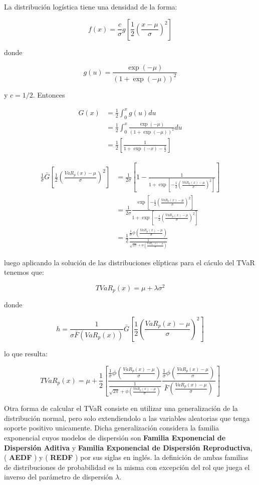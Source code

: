 \documentclass[]{article}
\begin{document}
La distribución logística tiene una densidad de la forma:

\[f(x)=\frac{c}{\sigma}g\left[\frac{1}{2}\left(\frac{x-\mu}{\sigma}\right)^2\right]\]

donde

\[g(u)= \frac{\exp(-\mu)}{(1+ \exp(-\mu))^2}\]

y \(c=1/2\). Entonces

\[\begin{array}{rl}
G(x) &\displaystyle=\frac{1}{2}\int_{0}^{x}g(u)du\\
&\displaystyle=\frac{1}{2}\int_{0}^{x}\frac{\exp(-\mu)}{(1+ \exp(-\mu))^2}du\\
&\displaystyle=\frac{1}{2}\left[\frac{1}{1+\exp(-x)-\frac{1}{2}}\right]
\end{array}\]

\[\begin{array}{rl}
\frac{1}{\sigma} \bar{G}\left[\frac{1}{2}\left(\frac{VaR_p(x)-\mu}{\sigma}\right)^2\right] &\displaystyle= \frac{1}{2 \sigma} \left[1-\frac{1}{1+ \exp\left[-\frac{1}{2}\left(\frac{VaR_p(x)-\mu}{\sigma}\right)^2\right]}\right]\\
&\displaystyle
= \frac{1}{2 \sigma}\frac{\exp\left[-\frac{1}{2} \left(\frac{VaR_p(x)-\mu}{\sigma}\right)^2\right]}{1+ \exp \left[-\frac{1}{2} \left(\frac{VaR_p(x)-\mu}{\sigma}\right)^2\right]}\\
&\displaystyle= \frac{1}{2} \frac{ \frac{1}{\sigma}\phi\left(\frac{VaR_p(x)-\mu}{\sigma}\right)}{\frac{1}{\sqrt{2\pi}+\phi\left(\frac{VaR_p(x)-\mu}{\sigma}\right)}}
\end{array}\]

luego aplicando la solución de las distribuciones elípticas para el
cáculo del TVaR tenemos que:

\[TVaR_p(x)= \mu + \lambda \sigma^2\]

donde

\[h=\frac{1}{\sigma \bar{F}(VaR_p(x))}\bar{G} \left[\frac{1}{2} \left(\frac{VaR_p(x)-\mu}{\sigma}\right)^2\right]\]

lo que resulta:

\[TVaR_p(x)= \mu + \frac{1}{2} \left[\frac{ \frac{1}{\sigma}\phi\left(\frac{VaR_p(x)-\mu}{\sigma}\right)}{\frac{1}{\sqrt{2\pi}+\phi\left(\frac{VaR_p(x)-\mu}{\sigma}\right)}}\frac{ \frac{1}{\sigma}\phi\left(\frac{VaR_p(x)-\mu}{\sigma}\right)}{\bar{F}(\frac{VaR_p(x)-\mu}{\sigma})} \right]\]

Otra forma de calcular el TVaR consiste en utilizar una generalización
de la distribución normal, pero solo extendiendolo a las variables
aleatorias que tenga soporte positivo unicamente. Dicha generalización
considera la familia exponencial cuyos modelos de dispersión son
\textbf{Familia Exponencial de Dispersión Aditiva} y \textbf{Familia
Exponencial de Dispersión Reproductiva}, ( \textbf{AEDF} ) y (
\textbf{REDF} ) por sus siglas en inglés. la definición de ambas
familias de distribuciones de probabilidad es la misma con excepción del
rol que juega el inverso del parámetro de dispersión \(\lambda\).
\end{document}
